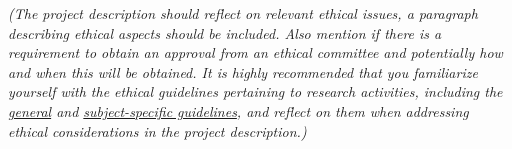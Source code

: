 %
%
\textit{(The project description should reflect on relevant ethical issues, a paragraph describing ethical aspects should be included. Also mention if there is a requirement to obtain an approval from an ethical committee and potentially how and when this will be obtained. It is highly recommended that you familiarize yourself with the ethical guidelines pertaining to research activities, including the \href{https://www.etikkom.no/globalassets/documents/publikasjoner-som-pdf/general-guidelines.pdf}{general} and \href{https://www.etikkom.no/en/ethical-guidelines-for-research/guidelines-for-research-ethics-in-science-and-technology/}{subject-specific guidelines}, and reflect on them when addressing ethical considerations in the project description.)}